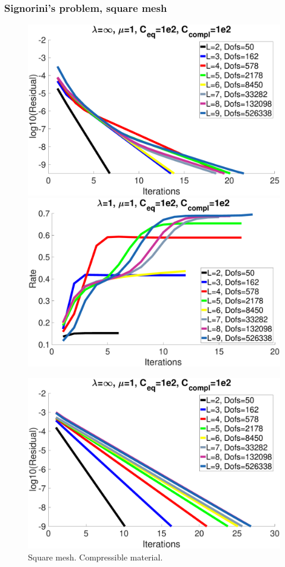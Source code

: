 \documentclass[8pt, oneside]{beamer}   	%
\begin{document}

\begin{frame}
\frametitle{\textbf{Signorini's problem, square mesh}}
\footnotesize
\begin{figure}[htbp!]
	\includegraphics[scale=0.08]{img/SquareResidualCompressible.eps}
	\quad
		\includegraphics[scale=0.08]{img/SquareRateCompressible.eps}
	\caption{Square mesh. Compressible material.}
	\label{ResidualRateSquare}
	\includegraphics[scale=0.08]{img/SquareResidualIncompressible.eps}

\end{figure}
\end{frame}
\end{document}
